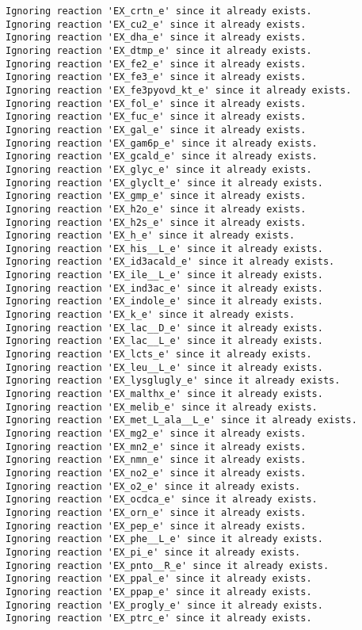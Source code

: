 \documentclass[
  letterpaper,
  DIV=11,
  numbers=noendperiod]{scrartcl}
\begin{document}
\begin{verbatim}
Ignoring reaction 'EX_crtn_e' since it already exists.
Ignoring reaction 'EX_cu2_e' since it already exists.
Ignoring reaction 'EX_dha_e' since it already exists.
Ignoring reaction 'EX_dtmp_e' since it already exists.
Ignoring reaction 'EX_fe2_e' since it already exists.
Ignoring reaction 'EX_fe3_e' since it already exists.
Ignoring reaction 'EX_fe3pyovd_kt_e' since it already exists.
Ignoring reaction 'EX_fol_e' since it already exists.
Ignoring reaction 'EX_fuc_e' since it already exists.
Ignoring reaction 'EX_gal_e' since it already exists.
Ignoring reaction 'EX_gam6p_e' since it already exists.
Ignoring reaction 'EX_gcald_e' since it already exists.
Ignoring reaction 'EX_glyc_e' since it already exists.
Ignoring reaction 'EX_glyclt_e' since it already exists.
Ignoring reaction 'EX_gmp_e' since it already exists.
Ignoring reaction 'EX_h2o_e' since it already exists.
Ignoring reaction 'EX_h2s_e' since it already exists.
Ignoring reaction 'EX_h_e' since it already exists.
Ignoring reaction 'EX_his__L_e' since it already exists.
Ignoring reaction 'EX_id3acald_e' since it already exists.
Ignoring reaction 'EX_ile__L_e' since it already exists.
Ignoring reaction 'EX_ind3ac_e' since it already exists.
Ignoring reaction 'EX_indole_e' since it already exists.
Ignoring reaction 'EX_k_e' since it already exists.
Ignoring reaction 'EX_lac__D_e' since it already exists.
Ignoring reaction 'EX_lac__L_e' since it already exists.
Ignoring reaction 'EX_lcts_e' since it already exists.
Ignoring reaction 'EX_leu__L_e' since it already exists.
Ignoring reaction 'EX_lysglugly_e' since it already exists.
Ignoring reaction 'EX_malthx_e' since it already exists.
Ignoring reaction 'EX_melib_e' since it already exists.
Ignoring reaction 'EX_met_L_ala__L_e' since it already exists.
Ignoring reaction 'EX_mg2_e' since it already exists.
Ignoring reaction 'EX_mn2_e' since it already exists.
Ignoring reaction 'EX_nmn_e' since it already exists.
Ignoring reaction 'EX_no2_e' since it already exists.
Ignoring reaction 'EX_o2_e' since it already exists.
Ignoring reaction 'EX_ocdca_e' since it already exists.
Ignoring reaction 'EX_orn_e' since it already exists.
Ignoring reaction 'EX_pep_e' since it already exists.
Ignoring reaction 'EX_phe__L_e' since it already exists.
Ignoring reaction 'EX_pi_e' since it already exists.
Ignoring reaction 'EX_pnto__R_e' since it already exists.
Ignoring reaction 'EX_ppal_e' since it already exists.
Ignoring reaction 'EX_ppap_e' since it already exists.
Ignoring reaction 'EX_progly_e' since it already exists.
Ignoring reaction 'EX_ptrc_e' since it already exists.

\end{verbatim}
\end{document}
